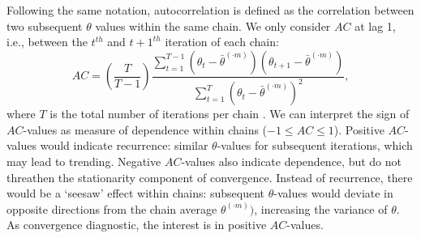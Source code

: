 \documentclass[article]{jss}
\begin{document}
Following the same notation, autocorrelation is defined as the correlation between two subsequent $\theta$ values within the same chain. We only consider $AC$ at lag 1, i.e., between the $t^{th}$ and $t+1^{th}$ iteration of each chain: 
%
\begin{equation*}
AC = \left( \frac{T}{T-1} \right) \frac{\sum_{t=1}^{T-1}(\theta_t - \bar{\theta}^{(\cdot m)})(\theta_{t+1} - \bar{\theta}^{(\cdot m)})}{\sum_{t=1}^{T}(\theta_t - \bar{\theta}^{(\cdot m)})^2},
\end{equation*}
%
where $T$ is the total number of iterations per chain \citep[p.~147]{lync07}. We can interpret the sign of $AC$-values as measure of dependence within chains ($-1 \leq AC \leq 1$). Positive $AC$-values would indicate recurrence: similar $\theta$-values for subsequent iterations, which may lead to trending. Negative $AC$-values also indicate dependence, but do not threathen the stationarity component of convergence. Instead of recurrence, there would be a `seesaw' effect within chains: subsequent $\theta$-values would deviate in opposite directions from the chain average $\theta^{(\cdot m)})$, increasing the variance of $\theta$. As convergence diagnostic, the interest is in positive $AC$-values.\footnotemark 
{}

\end{document}

